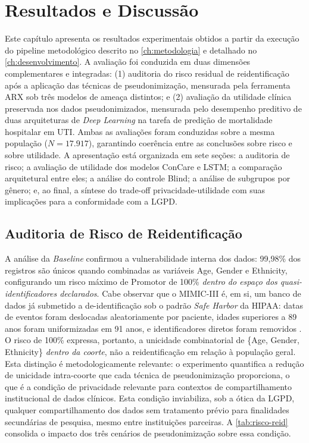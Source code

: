 \chapter{Resultados e Discussão}
\label{ch:resultados}

Este capítulo apresenta os resultados experimentais obtidos a partir da execução do pipeline metodológico descrito no \autoref{ch:metodologia} e detalhado no \autoref{ch:desenvolvimento}. A avaliação foi conduzida em duas dimensões complementares e integradas: (1) auditoria do risco residual de reidentificação após a aplicação das técnicas de pseudonimização, mensurada pela ferramenta ARX sob três modelos de ameaça distintos; e (2) avaliação da utilidade clínica preservada nos dados pseudonimizados, mensurada pelo desempenho preditivo de duas arquiteturas de \textit{Deep Learning} na tarefa de predição de mortalidade hospitalar em UTI. Ambas as avaliações foram conduzidas sobre a mesma população ($N = 17.917$), garantindo coerência entre as conclusões sobre risco e sobre utilidade. A apresentação está organizada em sete seções: a auditoria de risco; a avaliação de utilidade dos modelos ConCare e LSTM; a comparação arquitetural entre eles; a análise do controle Blind; a análise de subgrupos por gênero; e, ao final, a síntese do trade-off privacidade-utilidade com suas implicações para a conformidade com a LGPD.

\section{Auditoria de Risco de Reidentificação}
\label{sec:resultados-risco}

A análise da \textit{Baseline} confirmou a vulnerabilidade interna dos dados: 99,98\% dos registros são únicos quando combinadas as variáveis Age, Gender e Ethnicity, configurando um risco máximo de Promotor de 100\% \textit{dentro do espaço dos quasi-identificadores declarados}. Cabe observar que o MIMIC-III é, em si, um banco de dados já submetido a de-identificação sob o padrão \textit{Safe Harbor} da HIPAA: datas de eventos foram deslocadas aleatoriamente por paciente, idades superiores a 89 anos foram uniformizadas em 91 anos, e identificadores diretos foram removidos \cite{Johnson2016}. O risco de 100\% expressa, portanto, a unicidade combinatorial de \{Age, Gender, Ethnicity\} \textit{dentro da coorte}, não a reidentificação em relação à população geral. Esta distinção é metodologicamente relevante: o experimento quantifica a redução de unicidade intra-coorte que cada técnica de pseudonimização proporciona, o que é a condição de privacidade relevante para contextos de compartilhamento institucional de dados clínicos. Esta condição inviabiliza, sob a ótica da LGPD, qualquer compartilhamento dos dados sem tratamento prévio para finalidades secundárias de pesquisa, mesmo entre instituições parceiras. A \autoref{tab:risco-reid} consolida o impacto dos três cenários de pseudonimização sobre essa condição.

